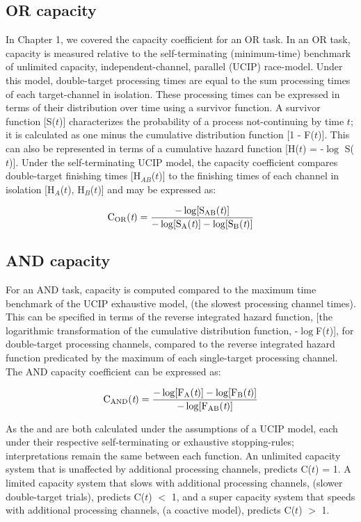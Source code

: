 \subsection{OR capacity}
In Chapter 1, we covered the capacity coefficient for an OR task. In an OR task, capacity is measured relative to the self-terminating (minimum-time) benchmark of unlimited capacity, independent-channel, parallel (UCIP) race-model. Under this model, double-target processing times are equal to the sum processing times of each target-channel in isolation. These processing times can be expressed in terms of their distribution over time using a survivor function. A survivor function [S($t$)] characterizes the probability of a process not-continuing by time $t$; it is calculated as one minus the cumulative distribution function [1 - F($t$)]. This can also be represented in terms of a cumulative hazard function [H($t$) = -$\log$ S($t$)]. Under the self-terminating UCIP model, the capacity coefficient compares double-target finishing times [H$_{AB}$($t$)] to the finishing times of each channel in isolation [H$_{A}$($t$), H$_{B}$($t$)] and may be expressed as:

\begin{equation}
	\rm C_{OR}({\rm \textit{t}}) = \frac{-\log[S_{AB}({\rm \textit{t}})]}{-\log[S_{A}({\rm \textit{t}})] - \log[S_{B}({\rm \textit{t}})]}
    \label{eq:Cor}
\end{equation}

\subsection{AND capacity}
For an AND task, capacity is computed compared to the maximum time benchmark of the UCIP exhaustive model, (\ie the slowest processing channel times). This can be specified in terms of the reverse integrated hazard function, [\ie the logarithmic transformation of the cumulative distribution function, -$\log$F($t$)], for double-target processing channels, compared to the reverse integrated hazard function predicated by the maximum of each single-target processing channel. The AND capacity coefficient can be expressed as: 

\begin{equation}
    \rm C_{AND}({\rm \textit{t}}) = \frac{-\log[F_{A}({\rm \textit{t}})]-\log[F_{B}({\rm \textit{t}})]}{-\log[F_{AB}({\rm \textit{t}})]}
    \label{eq:Cand}
\end{equation}

As the \Cor and \Cand are both calculated under the assumptions of a UCIP model, each under their respective self-terminating or exhaustive stopping-rules; interpretations remain the same between each function. An unlimited capacity system that is unaffected by additional processing channels, predicts C($t$) = 1. A limited capacity system that slows with additional processing channels, (\ie slower double-target trials), predicts C($t$) $<$ 1, and a super capacity system that speeds with additional processing channels, (\ie a coactive model), predicts C($t$) $>$ 1.


